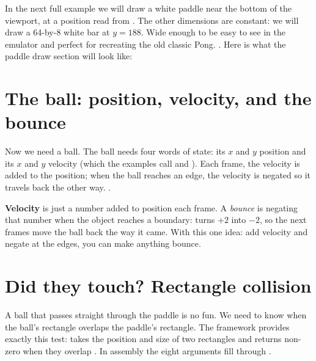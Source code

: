 In the next full example we will draw a white paddle near the bottom of the viewport,  
at a position read from . The other dimensions are constant: we will draw
a 64-by-8 white bar at $y=188$. Wide enough to be easy to see in the emulator and
perfect for recreating the old classic Pong. \citep{prg32repo}. Here is what
the paddle draw section will look like:



\section{The ball: position, velocity, and the bounce}

Now we need a ball. The ball needs four words of state: its $x$ and $y$ position
and its $x$ and $y$ velocity (which the examples call  and ).
Each frame, the velocity is added to the position; when the ball reaches an edge,
the velocity is negated so it travels back the other way. \citep{prg32repo}.



\begin{prgconcept}
\textbf{Velocity} is just a number added to position each frame. A \emph{bounce}
is negating that number when the object reaches a boundary: 
turns $+2$ into $-2$, so the next frames move the ball back the way it came. With
this one idea: add velocity and negate at the edges, you can make anything bounce.
\end{prgconcept}

\section{Did they touch? Rectangle collision}

A ball that passes straight through the paddle is no fun. We need to know when
the ball's rectangle overlaps the paddle's rectangle. The framework provides
exactly this test: 
takes the position and size of two rectangles and returns non-zero when they
overlap \citep{prg32tutorialgraphic}. In assembly the eight arguments fill
 through .

